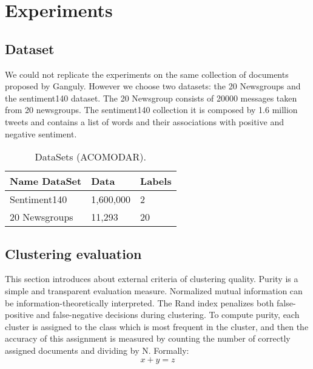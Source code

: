 \documentclass[runningheads]{llncs}
\begin{document}
\section{Experiments}

\subsection{Dataset}

We could not replicate the experiments on the same collection of
documents proposed by Ganguly\cite{ganguly_2018}. However 
we choose two datasets: the 20 Newsgroups and the sentiment140 dataset.
The 20 Newsgroup consists of 20000 messages taken from 20 newsgroups. 
The sentiment140 collection it is composed by 1.6 million tweets and contains a list of words and their associations with positive and negative sentiment.


\begin{table}
\centering
\caption{DataSets (ACOMODAR).}\label{tab1}
\begin{tabular}{|l|l|l|}
\hline
Name DataSet &  Data & Labels\\
\hline
Sentiment140 &  1,600,000& 2\\
20 Newsgroups & 11,293 & 20\\
\hline
\end{tabular}
\end{table}

%

\subsection{Clustering evaluation}

This section introduces about external criteria of clustering quality. Purity is
a simple and transparent evaluation measure. Normalized mutual information
can be information-theoretically interpreted. The Rand index penalizes both
false-positive and false-negative decisions during clustering.
To compute purity, each cluster is assigned to the class which is most frequent
in the cluster, and then the accuracy of this assignment is measured
by counting the number of correctly assigned documents and dividing by N.
Formally:
\begin{equation}
x + y = z
\end{equation}
\end{document}
